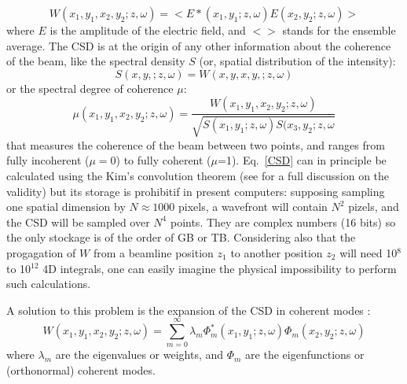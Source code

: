 \documentclass{iucr}              %
\begin{document}
\begin{equation}\label{CSD}
W(x_1,y_1,x_2,y_2;z,\omega) = <E*(x_1,y_1; z,\omega) E(x_2,y_2;z,\omega)>
\end{equation}
where $E$ is the amplitude of the electric field, and $<>$ stands for the ensemble average. The CSD is at the origin of any other information about the coherence of the beam, like the spectral density $S$ (or, spatial distribution of the intensity): 
\begin{equation}\label{SD}
S(x,y,;z,\omega) = W(x,y,x,y,;z,\omega)
\end{equation}
or the spectral degree of coherence $\mu$:
\begin{equation}\label{SDC}
\mu(x_1,y_1,x_2,y_2;z,\omega) = \frac{W(x_1,y_1,x_2,y_2;z,\omega)}{\sqrt{ S(x_1,y_1;z,\omega) S(x_3,y_2;z,\omega}}
\end{equation}
that measures the coherence of the beam between two points, and ranges from fully incoherent ($\mu=0$) to fully coherent ($\mu$=1). 
Eq.~\ref{CSD} can in principle be calculated using the Kim's convolution theorem \cite{kim1986} (see \cite{geloni2008} for a full discussion on the validity) but its storage is prohibitif in present computers: supposing sampling one spatial dimension by $N\approx1000$ pixels, a wavefront will contain $N^2$ pizels, and the CSD will be sampled over $N^4$ points. They are complex numbers (16 bits) so the only stockage is of the order of GB or TB. Considering also that the progagation of $W$ from a beamline position $z_1$ to another position $z_2$ will need 10$^8$ to 10$^{12}$ 4D integrals, one can easily imagine the physical impossibility to perform such calculations. 

A solution to this problem is the expansion of the CSD in coherent modes \cite{mandel_wolf}:  
\begin{equation}\label{decomposition}
 W(x_1,y_1,x_2,y_2;z,\omega) = \sum\limits_{m=0}^{\infty} \lambda_m \Phi_m^{*}(x_1,y_1;z,\omega) \Phi_m(x_2,y_2;z,\omega)
 \end{equation}
where $\lambda_m$ are the eigenvalues or weights, and $\Phi_m$ are the eigenfunctions or (orthonormal) coherent modes. 
\end{document}
